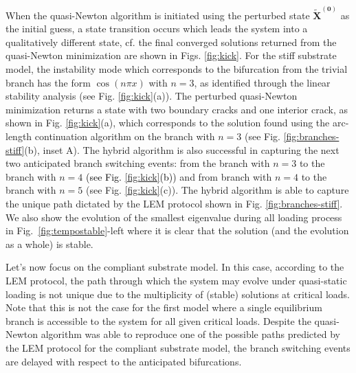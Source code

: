 \documentclass[10pt]{article}
\begin{document}
When the quasi-Newton algorithm is initiated using the perturbed state \(\mathbf{\tilde X^{(0)}}\) as the initial guess, {a state transition} occurs which leads the system into a qualitatively different state, cf. the final  converged solutions returned from the quasi-Newton minimization are shown in  Figs. \ref{fig:kick}. For the stiff substrate model, the {instability mode} which corresponds to the bifurcation from the trivial branch has the form \(\cos(n\pi x)\) with \(n=3\), as identified through the linear stability analysis (see Fig. {\ref{fig:kick}(a))}. 
The perturbed quasi-Newton minimization returns a state with two boundary cracks and one interior crack, as shown in Fig. {\ref{fig:kick}(a)}, which corresponds to the solution found using the arc-length continuation algorithm on the branch with \(n=3\) (see Fig. \ref{fig:branches-stiff}(b), inset A).  The hybrid algorithm is also successful in capturing the next two anticipated branch   switching events: from the  branch with \(n=3\)  to the branch  with \(n=4\) \textcolor{black}{(see Fig. \ref{fig:kick}(b))} and  from branch with \(n=4\)  to the branch  with \(n=5\) {(see Fig. \ref{fig:kick}(c))}. The hybrid algorithm is able to capture the unique path dictated by the LEM protocol shown in Fig. \ref{fig:branches-stiff}. {We also show the evolution of the smallest eigenvalue during all loading process in Fig.~\ref{fig:tempostable}-left where  it is clear that  the solution (and the evolution as a whole) is stable.}

Let's now  focus on the compliant substrate model. In this case, according to the LEM protocol, the path through which the system may evolve under quasi-static loading is not unique due to the multiplicity of (stable) solutions at critical loads.
Note that this is not the case for the first model where a single equilibrium branch is accessible to the system for all given critical loads.
Despite the quasi-Newton algorithm was able to reproduce one of the possible paths predicted by the LEM protocol for the compliant substrate model,  {the branch switching events} {are delayed with respect to the} anticipated bifurcations. 
\end{document}
